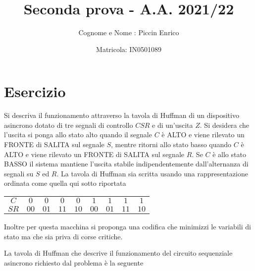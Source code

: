 \documentclass[a4paper]{extarticle}
\title{\textbf{Seconda prova - A.A. 2021/22\\}}
\author{Cognome e Nome : Piccin Enrico}
\date{Matricola: IN0501089}
\renewcommand\arraystretch{}
\begin{document}
\vspace{-10mm}
\maketitle

\noindent
\section{Esercizio}
Si descriva il funzionamento attraverso la tavola di Huffman di un dispositivo asincrono dotato di tre segnali di controllo $CSR$ e di un'uscita $Z$. Si desidera che l'uscita si ponga allo stato alto quando il segnale $C$ è ALTO e viene rilevato un FRONTE di SALITA sul segnale $S$, mentre ritorni allo stato basso quando $C$ è ALTO e viene rilevato un FRONTE di SALITA sul segnale $R$. Se $C$ è allo stato BASSO il sistema mantiene l'uscita stabile indipendentemente dall'alternanza di segnali su $S$ ed $R$. La tavola di Huffman sia scritta usando una rappresentazione ordinata come quella qui sotto riportata

\vspace{1em}
\noindent
\begin{table}[H]
\setlength{\tabcolsep}{4pt}
\renewcommand{\arraystretch}{1.2}
\centering
\begin{tabular}{c|cccc|cccc|}
    \hline
    $C$ & $0$ & $0$ & $0$ & $0$ & $1$ & $1$ & $1$ & $1$\\
    $SR$ & $00$ & $01$ & $11$ & $10$ & $00$ & $01$ & $11$ & $10$\\
    \hline
\end{tabular}
\end{table}

\vspace{1em}
\noindent
Inoltre per questa macchina si proponga una codifica che minimizzi le variabili di stato ma che sia priva di corse critiche.

\vspace{2em}
\noindent
La tavola di Huffman che descrive il funzionamento del circuito sequenziale asincrono richiesto dal problema è la seguente
\end{document}
